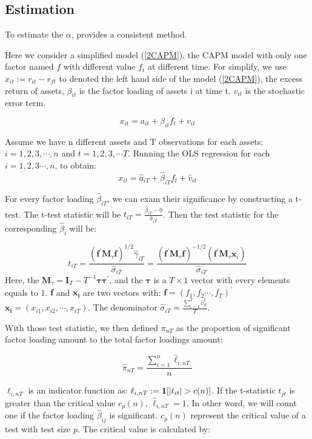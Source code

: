 \documentclass[12pt]{article}
\begin{document}
	\subsection{Estimation}\label{estimation}
To estimate the $\alpha$,  provides a consistent method.

Here we consider a simplified model (\ref{2CAPM}), the CAPM model with only one factor named $f$ with different value $f_t$ at different time. 
For simplify, we use $x_{it}:= r_{it} - r_{ft}$ to denoted the left hand side of the model (\ref{2CAPM}), the excess return of assets, $\beta_{it}$ is the factor loading of assets i at time t.
$v_{it}$ is the stochastic error term.

\[  x_{it} = a_{it} +  \beta_{it}f_{t} + v_{it} \tag{2} \label{1CAPM}\]

Assume we have n different assets and T observations for each assets: $i = 1, 2, 3, \cdots, n$ and $t = 1,2,3, \cdots T$.
Running the OLS regression for each $i = 1,2,3\cdots, n$, to obtain:
\[   x_{it} = \hat{a}_{iT} +  \hat{\beta}_{iT}f_{t} + \hat{v}_{it}  \]

For every factor loading $\hat{\beta}_{iT}$, we can exam their significance by constructing a t-test.
The t-test statistic will be $t_{iT} = \frac{\hat{\beta}_{iT} - 0}{\hat{\sigma}_{iT}}$.  
Then the test statistic for the corresponding $\hat{\beta}_i$ will be:

\[t_{i T}=\frac{\left(\mathbf{f}^{\prime} \mathbf{M}_{\tau} \mathbf{f}\right)^{1 / 2} \hat{\gamma}_{i T}}{\hat{\sigma}_{i T}}=\frac{\left(\mathbf{f}^{\prime} \mathbf{M}_{\tau} \mathbf{f}\right)^{-1 / 2}\left(\mathbf{f}^{\prime} \mathbf{M}_{\tau} \mathbf{x}_{i}\right)}{\hat{\sigma}_{i T}}\]
Here, the $\mathbf{M}_{\tau} = \mathbf{I}_T - T^{-1}\mathbf{\tau}\mathbf{\tau^\prime}$, and the $\mathbf{\tau}$ is a $T\times 1$ vector with every elements equals to 1.
$\mathbf{f}$ and $\mathbf{x_i}$ are two vectors with: $\mathbf{f} = (f_1, f_2 \cdots, f_T)^{\prime}$   $\mathbf{x_i} = (x_{i1}, x_{i2}, \cdots, x_{iT})$.
The denominator $\hat{\sigma}_{iT} = \frac{\sum_{i=1}^{T} \hat{v}^2_{it} }{T}$.

With those test statistic, we then defined $\pi_{nT}$ as the proportion of significant factor loading amount to the total factor loadings amount:

\[  \hat{\pi}_{nT} = \frac{\sum_{i=1}^n \hat{\ell}_{i,nT}}{n} \tag{3} \label{pi_function} \]

$\ell_{i,nT}$ is an indicator function as: $\ell_{i,nT} := {\bf1}[|t_{it}|>c(n)]$. 
If the t-statistic $t_{jt}$ is greater than the critical value $c_p(n)$,  $\hat{\ell}_{i,nT} = 1$. 
In other word, we will count one if the factor loading $\hat{\beta}_{ij}$ is significant. 
$c_p(n)$ represent the critical value of a test with test size $p$. 
The critical value is calculated by:
\end{document}
